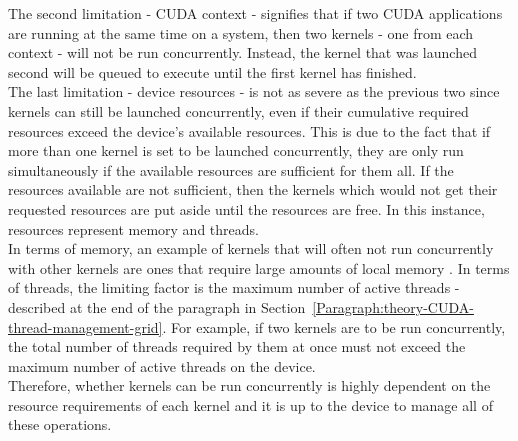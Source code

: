 The second limitation - CUDA context - signifies that if two CUDA applications are running at the same time on a system, then two kernels - one from each context - will not be run concurrently. Instead, the kernel that was launched second will be queued to execute until the first kernel has finished. \\
The last limitation - device resources - is not as severe as the previous two since kernels can still be launched concurrently, even if their cumulative required resources exceed the device's available resources. This is due to the fact that if more than one kernel is set to be launched concurrently, they are only run simultaneously if the available resources are sufficient for them all. If the resources available are not sufficient, then the kernels which would not get their requested resources are put aside until the resources are free. In this instance, resources represent memory and threads. \\
In terms of memory, an example of kernels that will often not run concurrently with other kernels are ones that require large amounts of local memory \cite{NVIDIAMay2022}. In terms of threads, the limiting factor is the maximum number of active threads - described at the end of the \textit{} paragraph in Section~\ref{Paragraph:theory-CUDA-thread-management-grid}. For example, if two kernels are to be run concurrently, the total number of threads required by them at once must not exceed the maximum number of active threads on the device. \\
Therefore, whether kernels can be run concurrently is highly dependent on the resource requirements of each kernel and it is up to the device to manage all of these operations.

